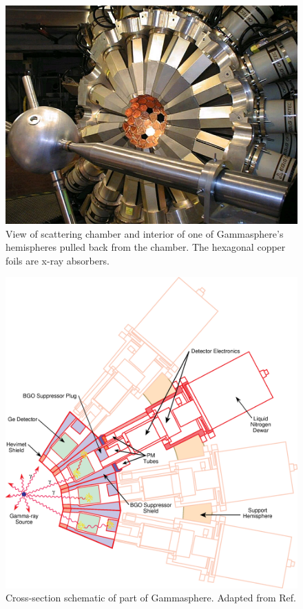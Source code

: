 \begin{figure}[ht!]
	\centerline{\includegraphics[height=0.3\textheight]{./img/c3/gammasphere_hemi.jpg}}
	\caption{View of scattering chamber and interior of one of Gammasphere's hemispheres pulled back from the chamber. The hexagonal copper foils are x-ray absorbers.}
	\label{fig:chp3-gs-hemisphere}
\end{figure}


\begin{figure}[h]
	\centerline{\includegraphics[height=0.5\textheight]{./img/c3/gammasphere_detector.eps}}
	\caption{Cross-section schematic of part of Gammasphere. Adapted from Ref.\cite{gsBooklet}}
	\label{fig:chp3-gs_det_schem}
\end{figure}

